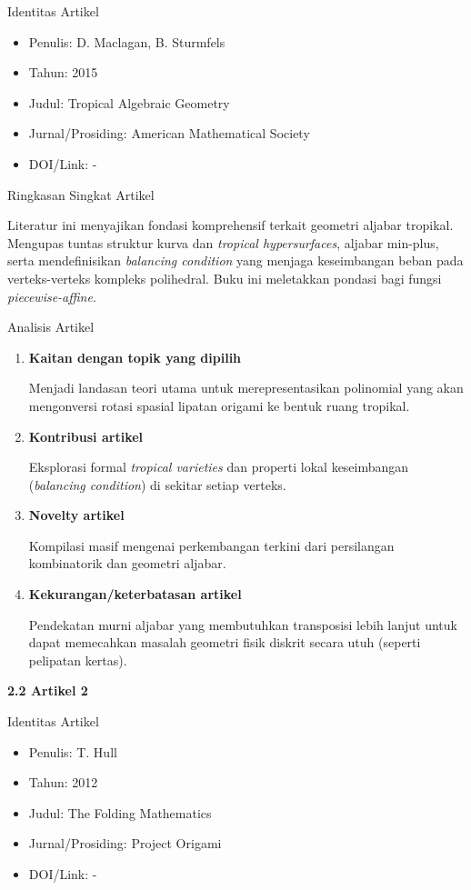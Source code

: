 \documentclass[12pt,a4paper]{article}
\begin{document}
\noindent Identitas Artikel
\begin{itemize}
      \item[-] Penulis: D. Maclagan, B. Sturmfels
      \item[-] Tahun: 2015
      \item[-] Judul: Tropical Algebraic Geometry
      \item[-] Jurnal/Prosiding: American Mathematical Society
      \item[-] DOI/Link: -
\end{itemize}


\noindent Ringkasan Singkat Artikel\par
Literatur ini menyajikan fondasi komprehensif terkait geometri aljabar tropikal. Mengupas tuntas struktur kurva dan \textit{tropical hypersurfaces}, aljabar min-plus, serta mendefinisikan \textit{balancing condition} yang menjaga keseimbangan beban pada verteks-verteks kompleks polihedral. Buku ini meletakkan pondasi bagi fungsi \textit{piecewise-affine}.


\noindent Analisis Artikel
\begin{enumerate}
      \item \textbf{Kaitan dengan topik yang dipilih}\par
            Menjadi landasan teori utama untuk merepresentasikan polinomial yang akan mengonversi rotasi spasial lipatan origami ke bentuk ruang tropikal.
      \item \textbf{Kontribusi artikel}\par
            Eksplorasi formal \textit{tropical varieties} dan properti lokal keseimbangan (\textit{balancing condition}) di sekitar setiap verteks.
      \item \textbf{Novelty artikel}\par
            Kompilasi masif mengenai perkembangan terkini dari persilangan kombinatorik dan geometri aljabar.
      \item \textbf{Kekurangan/keterbatasan artikel}\par
            Pendekatan murni aljabar yang membutuhkan transposisi lebih lanjut untuk dapat memecahkan masalah geometri fisik diskrit secara utuh (seperti pelipatan kertas).
\end{enumerate}

\newpage
\noindent\textbf{\large 2.2 Artikel 2 \cite{hull2012project}}\par

\noindent Identitas Artikel
\begin{itemize}
      \item[-] Penulis: T. Hull
      \item[-] Tahun: 2012
      \item[-] Judul: The Folding Mathematics
      \item[-] Jurnal/Prosiding: Project Origami
      \item[-] DOI/Link: -
\end{itemize}
\end{document}
